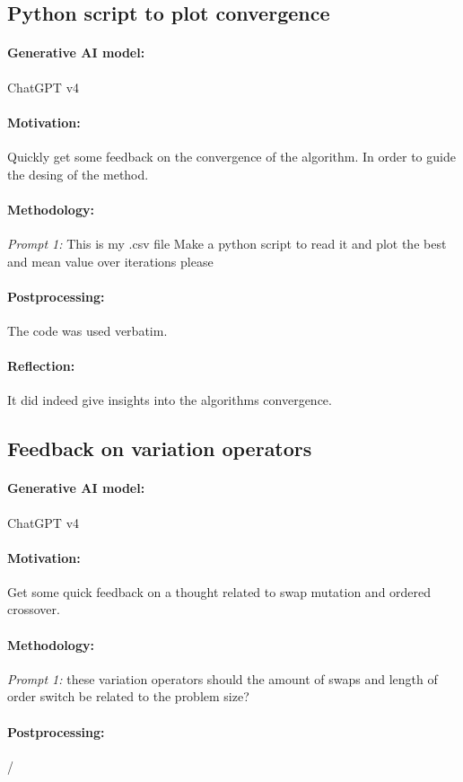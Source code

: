 \documentclass[a4paper,10pt]{article} %
\begin{document}
\subsection{Python script to plot convergence} 
\paragraph{Generative AI model:} ChatGPT v4
\paragraph{Motivation:}
Quickly get some feedback on the convergence of the algorithm. In order to guide the desing of the method.
\paragraph{Methodology:} 
\textit{Prompt 1:}
This is my .csv file Make a python script to read it and plot the best and mean value over iterations please
\paragraph{Postprocessing:} 
The code was used verbatim.
\paragraph{Reflection:} 
It did indeed give insights into the algorithms convergence.

\subsection{Feedback on variation operators} 
\paragraph{Generative AI model:} ChatGPT v4
\paragraph{Motivation:}
Get some quick feedback on a thought related to swap mutation and ordered crossover.
\paragraph{Methodology:} 
\textit{Prompt 1:}
these variation operators should the amount of swaps and length of order switch be related to the problem size?
\paragraph{Postprocessing:} 
/
\end{document}
